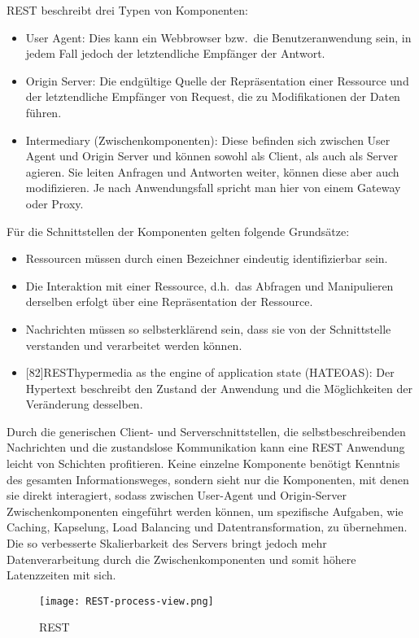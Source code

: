 REST beschreibt drei Typen von Komponenten:\cite[vgl.][96]{REST}
\begin{itemize}
  \item User Agent:
  Dies kann ein Webbrowser bzw.\ die Benutzeranwendung sein, in jedem Fall jedoch der letztendliche Empfänger der Antwort.
  \item Origin Server:
  Die endgültige Quelle der Repräsentation einer Ressource und der letztendliche Empfänger von Request, die zu Modifikationen der Daten führen.
  \item Intermediary (Zwischenkomponenten):
  Diese befinden sich zwischen User Agent und Origin Server und können sowohl als Client, als auch als Server agieren. Sie leiten Anfragen und Antworten weiter, können diese aber auch modifizieren. Je nach Anwendungsfall spricht man hier von einem Gateway oder Proxy.
\end{itemize}
Für die Schnittstellen der Komponenten gelten folgende Grundsätze:\cite[vgl.][82]{REST}
\begin{itemize}
  \item Ressourcen müssen durch einen Bezeichner eindeutig identifizierbar sein.
  \item Die Interaktion mit einer Ressource, d.h.\ das Abfragen und Manipulieren derselben erfolgt über eine Repräsentation der Ressource.
  \item Nachrichten müssen so selbsterklärend sein, dass sie von der Schnittstelle verstanden und verarbeitet werden können.
  \item {}[82]{REST}{hypermedia as the engine of application state} (HATEOAS): Der Hypertext beschreibt den Zustand der Anwendung und die Möglichkeiten der Veränderung desselben.
\end{itemize}
\par
Durch die generischen Client- und Serverschnittstellen, die selbstbeschreibenden Nachrichten und die zustandslose Kommunikation kann eine REST Anwendung leicht von Schichten profitieren.
Keine einzelne Komponente benötigt Kenntnis des gesamten Informationsweges, sondern sieht nur die Komponenten, mit denen sie direkt interagiert, sodass zwischen
User-Agent und Origin-Server Zwischenkomponenten eingeführt werden können, um spezifische Aufgaben, wie Caching, Kapselung, Load Balancing und Datentransformation, zu übernehmen.\cite[vgl.][99]{REST}
Die so verbesserte Skalierbarkeit des Servers bringt jedoch mehr Datenverarbeitung durch die Zwischenkomponenten und somit höhere Latenzzeiten mit sich.\cite[vgl.][83,98]{REST}
\begin{figure}[h]
  \centering
  \texttt{[image: REST-process-view.png]}
  \caption{REST~\cite[84]{REST}}\label{img:REST-diss}
\end{figure}

